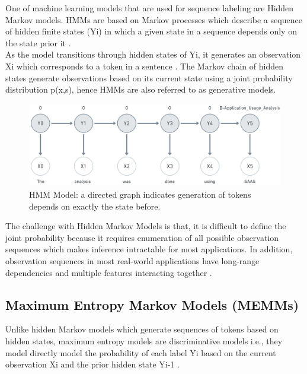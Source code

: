 One of machine learning models that are used for sequence labeling are Hidden Markov models. HMMs are based on Markov processes which describe a sequence of hidden finite states (Yi) in which a given state in a sequence depends only on the state prior it \citep{enwiki:1071684499, enwiki:1068802172}. \\

As the model transitions through hidden states of Yi, it generates an observation Xi which corresponds to a token in a sentence \citep{aggarwal2018machine}. The Markov chain of hidden states generate observations based on its current state using a joint probability distribution p(x,s), hence HMMs are also referred to as generative models. \\

\begin{figure}[htbp]
	\centering
	\includegraphics[width=1\textwidth]{4.graphics/figures/ch_5/HMM}
	\caption{\ac{HMM} Model: a directed graph indicates generation of tokens depends on exactly the state before.}
	\label{fig:chapter03:setup}
\end{figure}


The challenge with Hidden Markov Models is that, it is difficult to define the joint probability because it requires enumeration of all possible observation sequences which makes inference intractable for most applications. In addition, observation sequences in most real-world applications have long-range dependencies and multiple features interacting together \citep{bulla2006application, wallach2004conditional}.
 
\subsection{Maximum Entropy Markov Models (\ac{MEMM}s)}
\label{sec:chapter05:MLModels:MEMMs}

Unlike hidden Markov models which generate sequences of tokens based on hidden states, maximum entropy models are discriminative models i.e., they model directly model the probability of each label Yi based on the current observation Xi and the prior hidden state Yi-1 \citep{mccallum2000maximum}. 

